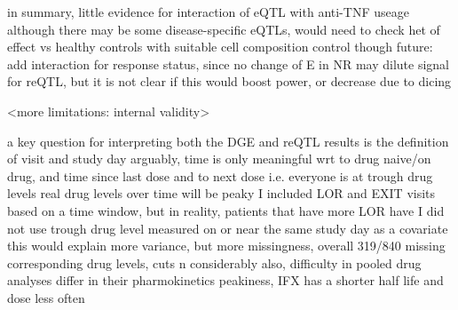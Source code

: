 \begin{outline}
    \2 in summary, little evidence for interaction of eQTL with anti-TNF useage
        \3 although there may be some disease-specific eQTLs, would need to check het of effect vs healthy controls with suitable cell composition control though
        \3 future: add interaction for response status, since no change of E in NR may dilute signal for reQTL, but it is not clear if this would boost power, or decrease due to dicing

\1 <more limitations: internal validity>

    \2 a key question for interpreting both the DGE and reQTL results is the definition of visit and study day
        \3 arguably, time is only meaningful wrt to drug naive/on drug, and time since last dose and to next dose i.e. everyone is at trough drug levels
        \3 real drug levels over time will be peaky
        \3 I included LOR and EXIT visits based on a time window, but in reality, patients that have more LOR have 
        \3 I did not use trough drug level measured on or near the same study day as a covariate
        \3 this would explain more variance, but
            more missingness, overall 319/840 missing corresponding drug levels, cuts n considerably
        \3 also, difficulty in pooled drug analyses
        \3 differ in their pharmokinetics peakiness, IFX has a shorter half life and dose less often \autocite{lichtenstein2013ComprehensiveReviewAntitumor}


\end{outline}
